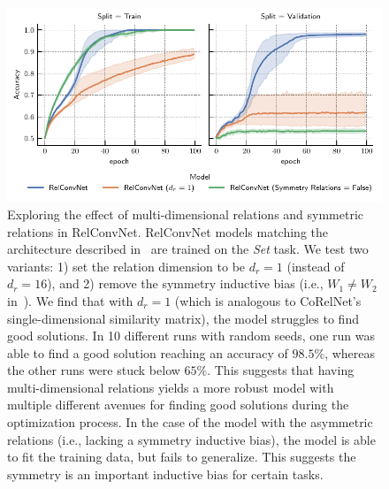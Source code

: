 \begin{figure}[H]
    \centering
    \includegraphics{figs/experiments/contains_set_training_curves_relconvnet_ablation.pdf}
    \caption{Exploring the effect of multi-dimensional relations and symmetric relations in RelConvNet. RelConvNet models matching the architecture described in~ are trained on the \textit{Set} task. We test two variants: 1) set the relation dimension to be $d_r = 1$ (instead of $d_r = 16$), and 2) remove the symmetry inductive bias (i.e., $W_1 \neq W_2$ in~). We find that with $d_r = 1$ (which is analogous to CoRelNet's single-dimensional similarity matrix), the model struggles to find good solutions. In 10 different runs with random seeds, one run was able to find a good solution reaching an accuracy of $98.5\%$, whereas the other runs were stuck below $65\%$. This suggests that having multi-dimensional relations yields a more robust model with multiple different avenues for finding good solutions during the optimization process. In the case of the model with the asymmetric relations (i.e., lacking a symmetry inductive bias), the model is able to fit the training data, but fails to generalize. This suggests the symmetry is an important inductive bias for certain tasks.}\label{fig:set_relconvnet_ablations}
\end{figure}
\null
\vfill
